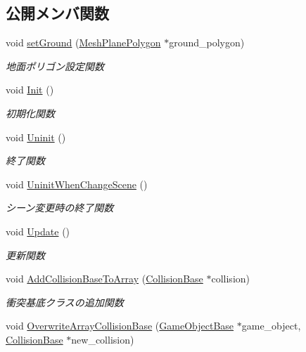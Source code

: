 \subsection*{公開メンバ関数}
\begin{DoxyCompactItemize}
\item 
void \mbox{\hyperlink{class_collision_manager_a0591bf9f6fc5bfbd9041106c5297ef83}{set\+Ground}} (\mbox{\hyperlink{class_mesh_plane_polygon}{Mesh\+Plane\+Polygon}} $\ast$ground\+\_\+polygon)
\begin{DoxyCompactList}\small\item\em 地面ポリゴン設定関数 \end{DoxyCompactList}\item 
void \mbox{\hyperlink{class_collision_manager_a2c5770b90b7a46a5674df008a7a57145}{Init}} ()
\begin{DoxyCompactList}\small\item\em 初期化関数 \end{DoxyCompactList}\item 
void \mbox{\hyperlink{class_collision_manager_abfa4b87f3ce102f0d173e112e7963f09}{Uninit}} ()
\begin{DoxyCompactList}\small\item\em 終了関数 \end{DoxyCompactList}\item 
void \mbox{\hyperlink{class_collision_manager_a33ce56b5a6f68d71b0f2bf733413dddb}{Uninit\+When\+Change\+Scene}} ()
\begin{DoxyCompactList}\small\item\em シーン変更時の終了関数 \end{DoxyCompactList}\item 
void \mbox{\hyperlink{class_collision_manager_a23c21d077dbfd7ca86e7c0649d775dfc}{Update}} ()
\begin{DoxyCompactList}\small\item\em 更新関数 \end{DoxyCompactList}\item 
void \mbox{\hyperlink{class_collision_manager_a42be7a26321110f5daaf1828da32f667}{Add\+Collision\+Base\+To\+Array}} (\mbox{\hyperlink{class_collision_base}{Collision\+Base}} $\ast$collision)
\begin{DoxyCompactList}\small\item\em 衝突基底クラスの追加関数 \end{DoxyCompactList}\item 
void \mbox{\hyperlink{class_collision_manager_af9c2ce87e0189cdd1256c83decc64673}{Overwrite\+Array\+Collision\+Base}} (\mbox{\hyperlink{class_game_object_base}{Game\+Object\+Base}} $\ast$game\+\_\+object, \mbox{\hyperlink{class_collision_base}{Collision\+Base}} $\ast$new\+\_\+collision)

\end{DoxyCompactItemize}
